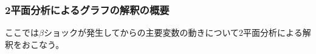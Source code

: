 
\subsubsection{2平面分析によるグラフの解釈の概要}
\label{sec:chapter5_beta_shock_interpretations_overview}
ここでは\(\beta\)ショックが発生してからの主要変数の動きについて2平面分析による解釈をおこなう。